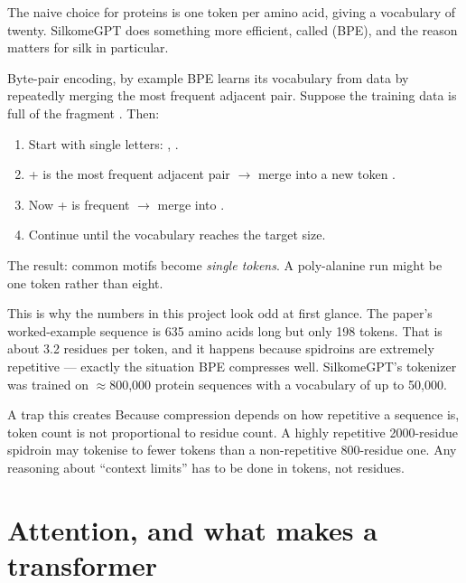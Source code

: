 The naive choice for proteins is one token per amino acid, giving a vocabulary
of twenty. SilkomeGPT does something more efficient, called  (BPE), and the reason matters for silk in particular.

\begin{keybox}{Byte-pair encoding, by example}
BPE learns its vocabulary from data by repeatedly merging the most frequent
adjacent pair. Suppose the training data is full of the fragment
. Then:

\begin{enumerate}[leftmargin=*,itemsep=1pt]
  \item Start with single letters: , .
  \item {}+ is the most frequent adjacent pair $\rightarrow$
        merge into a new token .
  \item Now + is frequent $\rightarrow$ merge into
        .
  \item Continue until the vocabulary reaches the target size.
\end{enumerate}

The result: common motifs become \emph{single tokens}. A poly-alanine run
 might be one token rather than eight.
\end{keybox}

This is why the numbers in this project look odd at first glance. The paper's
worked-example sequence is 635 amino acids long but only 198 tokens. That is
about 3.2 residues per token, and it happens because spidroins are extremely
repetitive --- exactly the situation BPE compresses well. SilkomeGPT's tokenizer
was trained on $\approx$800{,}000 protein sequences with a vocabulary of up to
50{,}000.

\begin{warnbox}{A trap this creates}
Because compression depends on how repetitive a sequence is, token count is not
proportional to residue count. A highly repetitive 2000-residue spidroin may
tokenise to fewer tokens than a non-repetitive 800-residue one. Any reasoning
about ``context limits'' has to be done in tokens, not residues.
\end{warnbox}

\section{Attention, and what makes a transformer}

